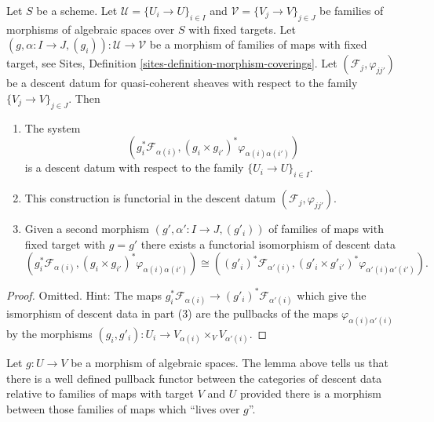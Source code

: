 \begin{lemma}
\label{lemma-map-families}
Let $S$ be a scheme.
Let $\mathcal{U} = \{U_i \to U\}_{i \in I}$ and
$\mathcal{V} = \{V_j \to V\}_{j \in J}$
be families of morphisms of algebraic spaces over $S$ with fixed targets.
Let $(g, \alpha : I \to J, (g_i)) : \mathcal{U} \to \mathcal{V}$
be a morphism of families of maps with fixed target, see
Sites, Definition \ref{sites-definition-morphism-coverings}.
Let $(\mathcal{F}_j, \varphi_{jj'})$ be a descent
datum for quasi-coherent sheaves with respect to the
family $\{V_j \to V\}_{j \in J}$. Then
\begin{enumerate}
\item The system
$$
\left(g_i^*\mathcal{F}_{\alpha(i)},
(g_i \times g_{i'})^*\varphi_{\alpha(i)\alpha(i')}\right)
$$
is a descent datum with respect to the family $\{U_i \to U\}_{i \in I}$.
\item This construction is functorial in the descent datum
$(\mathcal{F}_j, \varphi_{jj'})$.
\item Given a second morphism
$(g', \alpha' : I \to J, (g'_i))$
of families of maps with fixed target
with $g = g'$ there exists a functorial isomorphism of descent data
$$
(g_i^*\mathcal{F}_{\alpha(i)},
(g_i \times g_{i'})^*\varphi_{\alpha(i)\alpha(i')})
\cong
((g'_i)^*\mathcal{F}_{\alpha'(i)},
(g'_i \times g'_{i'})^*\varphi_{\alpha'(i)\alpha'(i')}).
$$
\end{enumerate}
\end{lemma}

\begin{proof}
Omitted. Hint: The maps
$g_i^*\mathcal{F}_{\alpha(i)} \to (g'_i)^*\mathcal{F}_{\alpha'(i)}$
which give the ismorphism of descent data in part (3)
are the pullbacks of the maps $\varphi_{\alpha(i)\alpha'(i)}$ by the
morphisms $(g_i, g'_i) : U_i \to V_{\alpha(i)} \times_V V_{\alpha'(i)}$.
\end{proof}

\noindent
Let $g : U \to V$ be a morphism of algebraic spaces.
The lemma above tells us that there is a well defined pullback functor
between the categories of descent data relative to families of
maps with target $V$ and $U$ provided there is a morphism between those
families of maps which ``lives over $g$''.

